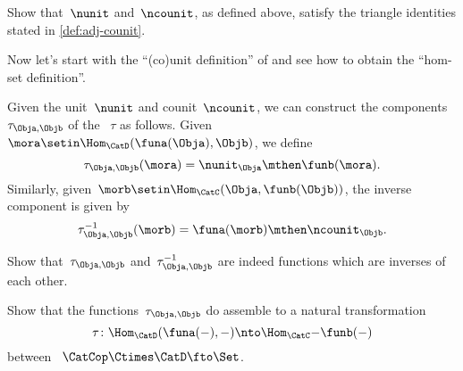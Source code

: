 \begin{solution}
    \missingsolution
\end{solution}

\begin{exercise}
    \label{ex:eta-epsilon-triangle}
    Show that~$\nunit$ and~$\ncounit$, as defined above, satisfy the triangle identities stated in \cref{def:adj-counit}.
\end{exercise}

\begin{solution}
    \missingsolution
\end{solution}

Now let's start with the ``(co)unit definition'' of  and see how to obtain the ``hom-set definition''.

Given the unit~$\nunit$ and counit~$\ncounit$, we can construct the components~$\tau_{\Obja,\Objb}$ of the ~$\tau$ as follows.
Given~$\mora \setin \Hom_{\CatD}(\funa(\Obja),\Objb)$, we define
\begin{equation}
    \tau_{\Obja,\Objb}(\mora) = \nunit_\Obja \mthen \funb(\mora).
\end{equation}
Similarly, given~$\morb \setin \Hom_{\CatC}(\Obja,\funb(\Objb))$, the inverse component is given by
\begin{equation}
    \tau_{\Obja,\Objb}^{-1}(\morb) = \funa(\morb) \mthen \ncounit_\Objb.
\end{equation}

\begin{exercise}
    \label{ex:tau}
    Show that~$\tau_{\Obja,\Objb}$ and~$\tau_{\Obja,\Objb}^{-1}$ are indeed functions which are inverses of each other.
\end{exercise}

\begin{solution}
    \missingsolution
\end{solution}

\begin{exercise}
    \label{ex:tau2}
    Show that the functions~$\tau_{\Obja,\Objb}$ do assemble to a natural transformation
    \begin{equation}
        \tau  \colon \Hom_{\CatD}(\funa(-),- ) \nto \Hom_{\CatC}{-}{\funb(-)}
    \end{equation}
    between ~$\CatCop \Ctimes \CatD \fto \Set $.
\end{exercise}

\begin{solution}
    \missingsolution
\end{solution}
